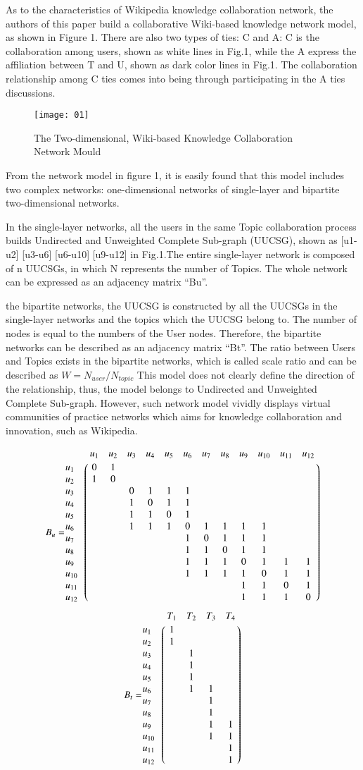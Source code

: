 \documentclass{elsarticle}
\begin{document}
As to the characteristics of Wikipedia knowledge collaboration network, the authors of this paper build a collaborative Wiki-based knowledge network model, as shown in Figure 1. There are also two types of ties: C and A: C is the collaboration among users, shown as white lines in Fig.1, while the A express the affiliation between T and U, shown as dark color lines in Fig.1. The collaboration relationship among C ties comes into being through participating in the A ties discussions.  

\begin{figure}[h]
  \centering
  \texttt{[image: 01]}
  \caption{The Two-dimensional, Wiki-based Knowledge Collaboration Network Mould}
\end{figure}

From the network model in figure 1, it is easily found that this model
includes two complex networks: one-dimensional networks of
single-layer and bipartite two-dimensional networks. 

In the single-layer networks, all the users in the same Topic collaboration process builds Undirected and Unweighted Complete Sub-graph (UUCSG), shown as [u1-u2] [u3-u6] [u6-u10] [u9-u12] in Fig.1.The entire single-layer network is composed of n UUCSGs, in which N represents the number of Topics. The whole network can be expressed as an adjacency matrix “Bu”.

 the bipartite networks, the UUCSG is constructed by all the UUCSGs in
 the single-layer networks and the topics which the UUCSG belong
 to. The number of nodes is equal to the numbers of the User
 nodes. Therefore, the bipartite networks can be described as an
 adjacency matrix “Bt”. The ratio between Users and Topics exists in
 the bipartite networks, which is called scale ratio and can be
 described as
 \begin{math}
 W = N_{user}/N_{topic}   
 \end{math}
This model does not clearly define the direction of the relationship, thus, the model belongs to Undirected and Unweighted Complete Sub-graph. However, such network model vividly displays virtual communities of practice networks which aims for knowledge collaboration and innovation, such as Wikipedia.



\begin{displaymath}
  B_u = \bordermatrix{%
    &u_1&u_2&u_3&u_4&u_5&u_6&u_7&u_8&u_9&u_{10}&u_{11}&u_{12} \cr
  u_1&0&1 \cr
  u_2&1&0 \cr
  u_3&&&0&1&1&1 \cr
   u_4&&&1&0&1&1 \cr
 u_5&&&1&1&0&1 \cr
 u_6&&&1&1&1&0&1&1&1&1 \cr
 u_7&&&&&&1&0&1&1&1 \cr
 u_8&&&&&&1&1&0&1&1 \cr
u_9&&&&&&1&1&1&0&1&1&1 \cr
  u_{10}&&&&&&1&1&1&1&0&1&1 \cr
   u_{11}&&&&&&&&&1&1&0&1 \cr
  u_{12}&&&&&&&&&1&1&1&0 \cr
}
\end{displaymath}
\begin{displaymath}
   B_t = \bordermatrix{%
    &T_1&T_2&T_3&T_4 \cr
   u_1&1 \cr
   u_2&1 \cr
    u_3&&1 \cr
    u_4&&1 \cr
    u_5&&1 \cr
    u_6&&1&1 \cr
    u_7&&&1 \cr
    u_8&&&1 \cr
    u_9&&&1&1 \cr
    u_{10}&&&1&1 \cr
    u_{11}&&&&1 \cr
    u_{12}&&&&1 \cr
}
\end{displaymath}
\end{document}
